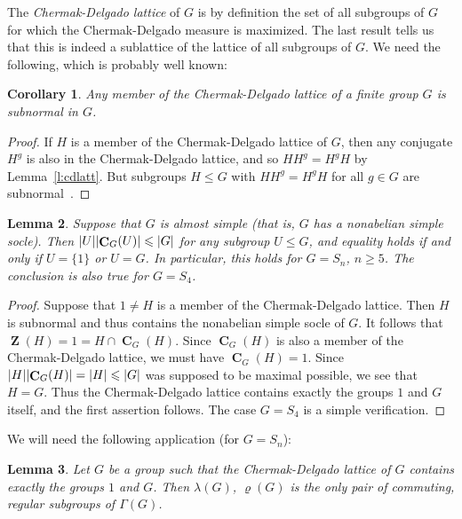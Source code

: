 \documentclass[10pt]{amsart}
\newtheorem{lemma}{Lemma}[section]
\newtheorem{cor}[lemma]{Corollary}
\renewcommand{\rho}{\varrho}
\renewcommand{\geq}{\geqslant}
\renewcommand{\leq}{\leqslant}
\DeclarePairedDelimiter{\card}{\lvert}{\rvert}
\DeclareMathOperator{\Zentr}{\mathbf{Z}}
\DeclareMathOperator{\Centrl}{\mathbf{C}}
\begin{document}
The \emph{Chermak-Delgado lattice} of $G$ is by definition
the set of all subgroups of $G$ for which 
the Chermak-Delgado measure is maximized.
The last result tells us that this is indeed a sublattice
of the lattice of all subgroups of $G$.
We need the following, which is probably well known:

\begin{cor}
  Any member of the Chermak-Delgado lattice
  of a finite group $G$ is subnormal in $G$.
\end{cor}

\begin{proof}
If $H$ is a member of the Chermak-Delgado lattice of $G$,
then any conjugate $H^g$ is also in the 
Chermak-Delgado lattice,
and so $HH^g = H^g H$ by Lemma~\ref{l:cdlatt}.
But subgroups $H\leq G$ with $HH^g = H^gH$ for all $g\in G$
are subnormal~\cite[Theorem~2.8]{IsaacsFGT}.
\end{proof}

\begin{lemma}\label{l:sn_cent_est}
    Suppose that $G$ is almost simple
    (that is, $G$ has a nonabelian simple
    socle). 
    Then $\card{U}\card{\Centrl_{G}(U)} \leq \card{G}$
    for any subgroup $U\leq G$,
    and equality holds if and only if
    $U = \{1\}$ or $U=G$.
    In particular, this holds for 
    $G= S_n$, $n\geq 5$.
    The conclusion is also true for $G=S_4$.
\end{lemma}

\begin{proof}
  Suppose that $1\neq H$ is a member of
  the Chermak-Delgado lattice.
  Then $H$ is subnormal and thus contains the nonabelian
  simple socle of $G$.
  It follows that $\Zentr(H)=1 = H \cap \Centrl_G(H)$.
  Since $\Centrl_G(H)$ is also a member of the Chermak-Delgado lattice,
  we must have $\Centrl_G(H)=1$.
  Since $\card{H}\card{\Centrl_G(H)} = \card{H} \leq \card{G}$
  was supposed to be maximal possible, we see that
  $H=G$.
  Thus the Chermak-Delgado lattice contains exactly the groups
  $1$ and $G$ itself,
  and the first assertion follows.
  The case $G=S_4$ is a simple verification.
\end{proof}

We will need the following application (for $G=S_n$):

\begin{lemma}\label{l:snwrc2_reg}
  Let $G$ be a group such that the Chermak-Delgado lattice of $G$
  contains exactly the groups $1$ and $G$.
  Then $\lambda(G)$, $\rho(G)$ is the only pair of
  commuting, regular subgroups of\/ $\Gamma(G)$.
\end{lemma}
\end{document}
